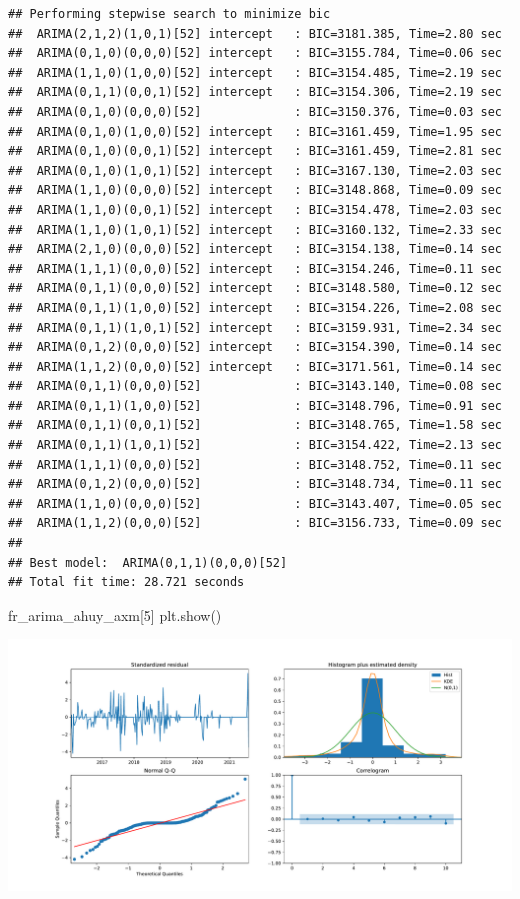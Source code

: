 \documentclass[
]{book}
\newenvironment{Shaded}{\begin{snugshade}}{\end{snugshade}}
\newcommand{\DecValTok}[1]{\textcolor[rgb]{0.00,0.00,0.81}{#1}}
\newcommand{\NormalTok}[1]{#1}
\begin{document}
\begin{verbatim}
## Performing stepwise search to minimize bic
##  ARIMA(2,1,2)(1,0,1)[52] intercept   : BIC=3181.385, Time=2.80 sec
##  ARIMA(0,1,0)(0,0,0)[52] intercept   : BIC=3155.784, Time=0.06 sec
##  ARIMA(1,1,0)(1,0,0)[52] intercept   : BIC=3154.485, Time=2.19 sec
##  ARIMA(0,1,1)(0,0,1)[52] intercept   : BIC=3154.306, Time=2.19 sec
##  ARIMA(0,1,0)(0,0,0)[52]             : BIC=3150.376, Time=0.03 sec
##  ARIMA(0,1,0)(1,0,0)[52] intercept   : BIC=3161.459, Time=1.95 sec
##  ARIMA(0,1,0)(0,0,1)[52] intercept   : BIC=3161.459, Time=2.81 sec
##  ARIMA(0,1,0)(1,0,1)[52] intercept   : BIC=3167.130, Time=2.03 sec
##  ARIMA(1,1,0)(0,0,0)[52] intercept   : BIC=3148.868, Time=0.09 sec
##  ARIMA(1,1,0)(0,0,1)[52] intercept   : BIC=3154.478, Time=2.03 sec
##  ARIMA(1,1,0)(1,0,1)[52] intercept   : BIC=3160.132, Time=2.33 sec
##  ARIMA(2,1,0)(0,0,0)[52] intercept   : BIC=3154.138, Time=0.14 sec
##  ARIMA(1,1,1)(0,0,0)[52] intercept   : BIC=3154.246, Time=0.11 sec
##  ARIMA(0,1,1)(0,0,0)[52] intercept   : BIC=3148.580, Time=0.12 sec
##  ARIMA(0,1,1)(1,0,0)[52] intercept   : BIC=3154.226, Time=2.08 sec
##  ARIMA(0,1,1)(1,0,1)[52] intercept   : BIC=3159.931, Time=2.34 sec
##  ARIMA(0,1,2)(0,0,0)[52] intercept   : BIC=3154.390, Time=0.14 sec
##  ARIMA(1,1,2)(0,0,0)[52] intercept   : BIC=3171.561, Time=0.14 sec
##  ARIMA(0,1,1)(0,0,0)[52]             : BIC=3143.140, Time=0.08 sec
##  ARIMA(0,1,1)(1,0,0)[52]             : BIC=3148.796, Time=0.91 sec
##  ARIMA(0,1,1)(0,0,1)[52]             : BIC=3148.765, Time=1.58 sec
##  ARIMA(0,1,1)(1,0,1)[52]             : BIC=3154.422, Time=2.13 sec
##  ARIMA(1,1,1)(0,0,0)[52]             : BIC=3148.752, Time=0.11 sec
##  ARIMA(0,1,2)(0,0,0)[52]             : BIC=3148.734, Time=0.11 sec
##  ARIMA(1,1,0)(0,0,0)[52]             : BIC=3143.407, Time=0.05 sec
##  ARIMA(1,1,2)(0,0,0)[52]             : BIC=3156.733, Time=0.09 sec
## 
## Best model:  ARIMA(0,1,1)(0,0,0)[52]          
## Total fit time: 28.721 seconds
\end{verbatim}

\begin{Shaded}
\begin{Highlighting}[]
\NormalTok{fr\_arima\_ahuy\_axm[}\DecValTok{5}\NormalTok{]}
\NormalTok{plt.show()}
\end{Highlighting}
\end{Shaded}

\includegraphics{bookdown-demo_files/figure-latex/unnamed-chunk-148-135.pdf}
\end{document}
